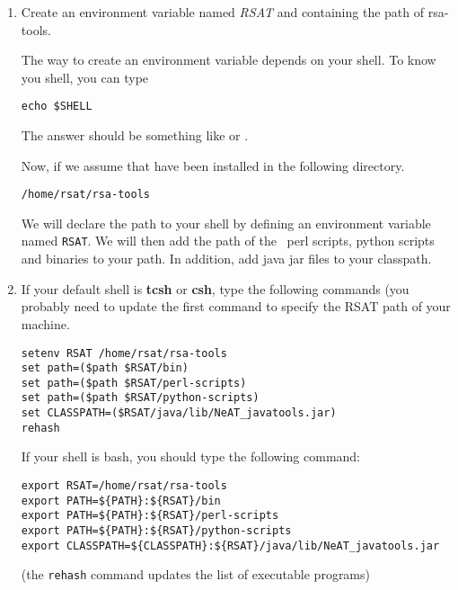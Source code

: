\begin{enumerate}

\item Create an environment variable named \textit{RSAT} and
  containing the path of rsa-tools.

  The way to create an environment variable depends on your shell. To
  know you shell, you can type

\lstset{language=csh}

\begin{lstlisting}
echo $SHELL
\end{lstlisting}

The answer should be something like  or
.

Now, if we assume that \RSAT have been installed in the following
directory.

\begin{lstlisting}
/home/rsat/rsa-tools
\end{lstlisting}


We will declare the \RSAT path to your shell by defining an
environment variable named \texttt{RSAT}.  We will then add the path
of the \RSAT \ perl scripts, python scripts and binaries to your
path. In addition, add java jar files to your classpath.

\item If your default shell is \textbf{tcsh} or \textbf{csh}, type the
  following commands (you probably need to update the first command to
  specify the RSAT path of your machine.

\begin{lstlisting}
setenv RSAT /home/rsat/rsa-tools
set path=($path $RSAT/bin)
set path=($path $RSAT/perl-scripts)
set path=($path $RSAT/python-scripts)
set CLASSPATH=($RSAT/java/lib/NeAT_javatools.jar)
rehash
\end{lstlisting}



If your shell is bash, you should type the following command:

\begin{lstlisting}
export RSAT=/home/rsat/rsa-tools
export PATH=${PATH}:${RSAT}/bin
export PATH=${PATH}:${RSAT}/perl-scripts
export PATH=${PATH}:${RSAT}/python-scripts
export CLASSPATH=${CLASSPATH}:${RSAT}/java/lib/NeAT_javatools.jar
\end{lstlisting}



(the \texttt{rehash} command updates the list of executable programs)

\end{enumerate}

